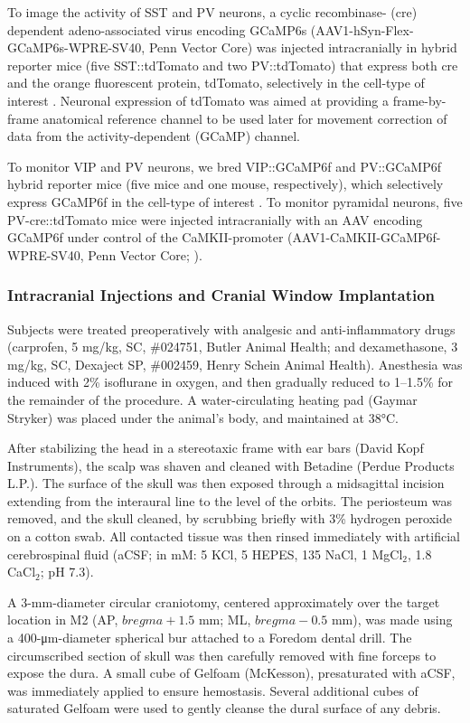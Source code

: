 To image the activity of SST and PV neurons, a cyclic recombinase- (cre) dependent adeno-associated virus encoding GCaMP6s (AAV1-hSyn-Flex-GCaMP6s-WPRE-SV40, Penn Vector Core) was injected intracranially in hybrid reporter mice (five SST::tdTomato and two PV::tdTomato) that express both cre and the orange fluorescent protein, tdTomato, selectively in the cell-type of interest \citep{taniguchi11, ali20}. Neuronal expression of tdTomato was aimed at providing a frame-by-frame anatomical reference channel to be used later for movement correction of data from the activity-dependent (GCaMP) channel. 

To monitor VIP and PV neurons, we bred VIP::GCaMP6f and PV::GCaMP6f hybrid reporter mice (five mice and one mouse, respectively), which selectively express GCaMP6f in the cell-type of interest \citep{daigle18,devries20}. 
To monitor pyramidal neurons, five PV-cre::tdTomato mice were injected intracranially with an AAV encoding GCaMP6f under control of the CaMKII-promoter (AAV1-CaMKII-GCaMP6f-WPRE-SV40, Penn Vector Core; \cite{kuchibhotla17,ali20}).

\subsubsection*{Intracranial Injections and Cranial Window Implantation}
Subjects were treated preoperatively with analgesic and anti-inflammatory drugs (carprofen, 5 mg/kg, SC, \#024751, Butler Animal Health; and dexamethasone, 3 mg/kg, SC, Dexaject SP, \#002459, Henry Schein Animal Health). Anesthesia was induced with 2\% isoflurane in oxygen, and then gradually reduced to 1--1.5\% for the remainder of the procedure. A water-circulating heating pad (Gaymar Stryker) was placed under the animal’s body, and maintained at 38\si{\celsius}.

After stabilizing the head in a stereotaxic frame with ear bars (David Kopf Instruments), the scalp was shaven and cleaned with Betadine (Perdue Products L.P.). The surface of the skull was then exposed through a midsagittal incision extending from the interaural line to the level of the orbits. The periosteum was removed, and the skull cleaned, by scrubbing briefly with 3\% hydrogen peroxide on a cotton swab. All contacted tissue was then rinsed immediately with artificial cerebrospinal fluid (aCSF; in mM: 5 KCl, 5 HEPES, 135 NaCl, 1 MgCl$_2$, 1.8 CaCl$_2$; pH 7.3).

A 3-mm-diameter circular craniotomy, centered approximately over the target location in M2 (AP, $\mathit{bregma}+1.5$ mm; ML, $\mathit{bregma}-0.5$ mm), was made using a 400-\si{\um}-diameter spherical bur attached to a Foredom dental drill. The circumscribed section of skull was then carefully removed with fine forceps to expose the dura. A small cube of Gelfoam (McKesson), presaturated with aCSF, was immediately applied to ensure hemostasis. Several additional cubes of saturated Gelfoam were used to gently cleanse the dural surface of any debris.

